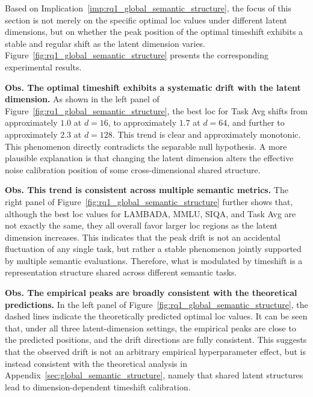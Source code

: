 
Based on Implication~\ref{imp:rq1_global_semantic_structure}, the focus of this section is not merely on the specific optimal loc values under different latent dimensions, but on whether the peak position of the optimal timeshift exhibits a stable and regular shift as the latent dimension varies. Figure~\ref{fig:rq1_global_semantic_structure} presents the corresponding experimental results.

\textbf{Obs.  The optimal timeshift exhibits a systematic drift with the latent dimension. }As shown in the left panel of Figure~\ref{fig:rq1_global_semantic_structure}, the best loc for Task Avg shifts from approximately $1.0$ at $d=16$, to approximately $1.7$ at $d=64$, and further to approximately $2.3$ at $d=128$. This trend is clear and approximately monotonic. This phenomenon directly contradicts the separable null hypothesis. A more plausible explanation is that changing the latent dimension alters the effective noise calibration position of some cross-dimensional shared structure.

\textbf{Obs.  This trend is consistent across multiple semantic metrics. }The right panel of Figure~\ref{fig:rq1_global_semantic_structure} further shows that, although the best loc values for LAMBADA, MMLU, SIQA, and Task Avg are not exactly the same, they all overall favor larger loc regions as the latent dimension increases. This indicates that the peak drift is not an accidental fluctuation of any single task, but rather a stable phenomenon jointly supported by multiple semantic evaluations. Therefore, what is modulated by timeshift is a representation structure shared across different semantic tasks.

\textbf{Obs.  The empirical peaks are broadly consistent with the theoretical predictions. }In the left panel of Figure~\ref{fig:rq1_global_semantic_structure}, the dashed lines indicate the theoretically predicted optimal loc values. It can be seen that, under all three latent-dimension settings, the empirical peaks are close to the predicted positions, and the drift directions are fully consistent. This suggests that the observed drift is not an arbitrary empirical hyperparameter effect, but is instead consistent with the theoretical analysis in Appendix~\ref{sec:global_semantic_structure}, namely that shared latent structures lead to dimension-dependent timeshift calibration.

